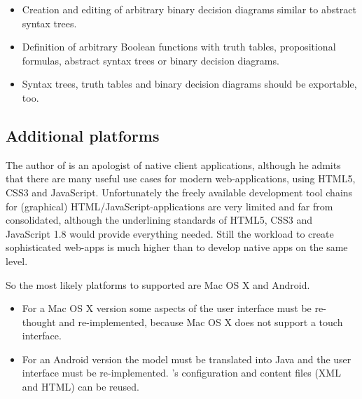 \begin{itemize}

\item Creation and editing of arbitrary binary decision diagrams similar to abstract syntax trees.

\item Definition of arbitrary Boolean functions with truth tables, propositional formulas, abstract syntax trees or binary decision diagrams.

\item Syntax trees, truth tables and binary decision diagrams should be exportable, too.

\end{itemize}


\subsection{Additional platforms}

The author of \Nyaya is an apologist of native client applications,
although he admits that there are many useful use cases for modern web-applications, 
using HTML5, CSS3 and JavaScript. 
Unfortunately the freely available development tool chains for (graphical) HTML/JavaScript-applications
are very limited and far from consolidated, although the underlining standards of HTML5, CSS3 
and JavaScript 1.8 would provide everything needed.
Still the workload to create sophisticated web-apps 
is much higher than to develop native apps on the same level.

So the most likely platforms to supported \Nyaya are Mac OS X and Android.

\begin{itemize}
\item
For a Mac OS X version some aspects of the user interface must be re-thought and re-implemented, 
because Mac OS X does not support a touch interface.
\item
For an Android version the model must be translated into Java and the user interface must be re-implemented.
{\Nyaya}’s configuration and content files (XML and HTML) can be reused.
\end{itemize}
